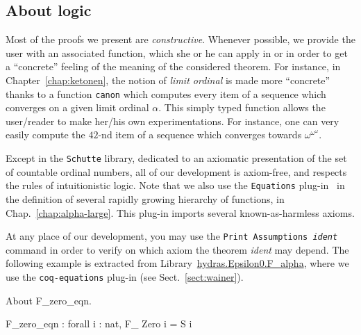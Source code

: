\documentclass[a4paper]{book}
\begin{document}
\subsection{About logic}

Most of the proofs we present are \emph{constructive}. Whenever possible, we provide the user with an associated function, which she or he can apply in \gallina{} or \ocaml{} in order to get a ``concrete'' feeling of the meaning of the considered theorem.
For instance, in Chapter~\vref{chap:ketonen}, the notion of \emph{limit ordinal} is
made more ``concrete'' thanks to a function \texttt{canon} which computes every item of a sequence which converges on a given limit ordinal $\alpha$. This simply typed function allows the user/reader to make her/his own experimentations.
For instance, one can very easily compute the $42$-nd item of a sequence which converges towards $\omega^{\omega^\omega}$.


 
Except in the \texttt{Schutte} library, dedicated to an axiomatic presentation of the set of countable ordinal numbers, all of our development is axiom-free, and respects the rules of intuitionistic logic. Note that we also use the \texttt{Equations} plug-in~\cite{sozeau:hal-01671777} in the definition of  several rapidly growing hierarchy of functions, in Chap.~\ref{chap:alpha-large}. This plug-in imports several known-as-harmless  axioms.



At any place of our development, you may use the  \texttt{Print Assumptions {\it ident}} command in order to verify on which axiom the theorem {\it ident} may depend. The following example is extracted from 
Library~\href{../theories/html/hydras.Epsilon0.F_alpha.html}{hydras.Epsilon0.F\_alpha}, where we use the \texttt{coq-equations} plug-in (see Sect.~\vref{sect:wainer}).

\begin{Coqsrc}
About F_zero_eqn.
\end{Coqsrc}

\begin{Coqanswer}
F_zero_eqn : forall i : nat, F_ Zero i = S i
\end{Coqanswer}
\end{document}
